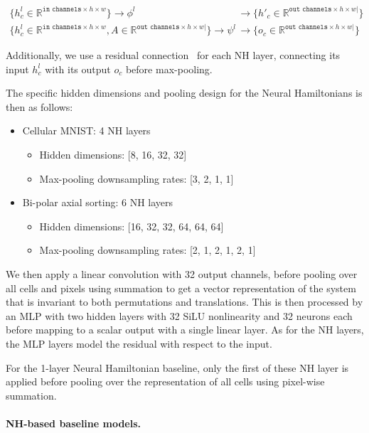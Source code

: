 \begin{align}
    \{h^l_c \in \mathbb{R}^{\texttt{in channels} \times h \times w}\} \rightarrow \phi^l &\rightarrow \{h'_c \in \mathbb{R}^{\texttt{out channels} \times h \times w|}\}\\
        \{h^l_c \in \mathbb{R}^{\texttt{in channels} \times h \times w}, A \in \mathbb{R}^{\texttt{out channels} \times h \times w|} \} \rightarrow \psi^l &\rightarrow \{o_c \in \mathbb{R}^{\texttt{out channels} \times h \times w|}\}
\end{align}

Additionally, we use a residual connection~\cite{He2016resnet} for each NH layer, connecting its input $h_c^l$ with its output $o_c$ before max-pooling.

The specific hidden dimensions and pooling design for the Neural Hamiltonians is then as follows:

\begin{itemize}
    \item Cellular MNIST: 4 NH layers
    \begin{itemize}
        \item Hidden dimensions: [8, 16, 32, 32]
        \item Max-pooling downsampling rates: [3, 2, 1, 1]
    \end{itemize}
    \item Bi-polar axial sorting: 6 NH layers
    \begin{itemize}
        \item Hidden dimensions: [16, 32, 32, 64, 64, 64]
        \item Max-pooling downsampling rates: [2, 1, 2, 1, 2, 1]
    \end{itemize}
\end{itemize}

We then apply a linear convolution with 32 output channels, before pooling over all cells and pixels using summation to get a vector representation of the system that is invariant to both permutations and translations. This is then processed by an MLP with two hidden layers with 32 SiLU nonlinearity and 32 neurons each before mapping to a scalar output with a single linear layer. As for the NH layers, the MLP layers model the residual with respect to the input.

For the 1-layer Neural Hamiltonian baseline, only the first of these NH layer is applied before pooling over the representation of all cells using pixel-wise summation.

\paragraph{NH-based baseline models.}


